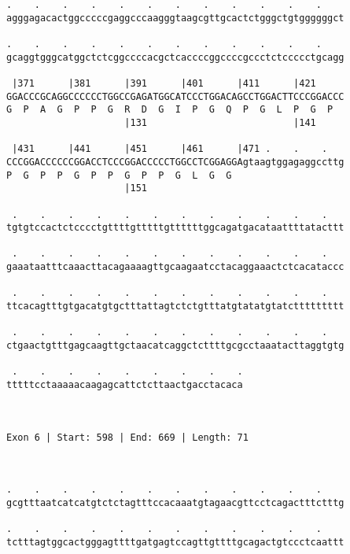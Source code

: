 \documentclass{article}
\begin{document}
\begin{Verbatim}
.    .    .    .    .    .    .    .    .    .    .    .    
agggagacactggcccccgaggcccaagggtaagcgttgcactctgggctgtggggggct
                                                            
.    .    .    .    .    .    .    .    .    .    .    .    
gcaggtgggcatggctctcggccccacgctcaccccggccccgccctctccccctgcagg
                                                            
 |371      |381      |391      |401      |411      |421     
GGACCCGCAGGCCCCCCTGGCCGAGATGGCATCCCTGGACAGCCTGGACTTCCCGGACCC
G  P  A  G  P  P  G  R  D  G  I  P  G  Q  P  G  L  P  G  P  
                     |131                          |141     
  
 |431      |441      |451      |461      |471 .    .    .   
CCCGGACCCCCCGGACCTCCCGGACCCCCTGGCCTCGGAGGAgtaagtggagaggccttg
P  G  P  P  G  P  P  G  P  P  G  L  G  G                    
                     |151                                   
  
 .    .    .    .    .    .    .    .    .    .    .    .   
tgtgtccactctcccctgttttgtttttgttttttggcagatgacataattttatacttt
                                                            
 .    .    .    .    .    .    .    .    .    .    .    .   
gaaataatttcaaacttacagaaaagttgcaagaatcctacaggaaactctcacataccc
                                                            
 .    .    .    .    .    .    .    .    .    .    .    .   
ttcacagtttgtgacatgtgctttattagtctctgtttatgtatatgtatcttttttttt
                                                            
 .    .    .    .    .    .    .    .    .    .    .    .   
ctgaactgtttgagcaagttgctaacatcaggctcttttgcgcctaaatacttaggtgtg
                                                            
 .    .    .    .    .    .    .    .    .
tttttcctaaaaacaagagcattctcttaactgacctacaca
                                          
                                          
 
Exon 6 | Start: 598 | End: 669 | Length: 71



.    .    .    .    .    .    .    .    .    .    .    .    
gcgtttaatcatcatgtctctagtttccacaaatgtagaacgttcctcagactttctttg
                                                            
.    .    .    .    .    .    .    .    .    .    .    .    
tctttagtggcactgggagttttgatgagtccagttgttttgcagactgtccctcaattt
                                                            

\end{Verbatim}
\end{document}
